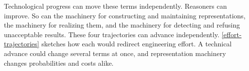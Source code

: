 
Technological progress can move these terms independently. Reasoners can improve. So can the machinery for constructing and maintaining representations, the machinery for realizing them, and the machinery for detecting and refusing unacceptable results. These four trajectories can advance independently. \autoref{effort-trajectories} sketches how each would redirect engineering effort. A technical advance could change several terms at once, and representation machinery changes probabilities and costs alike.

